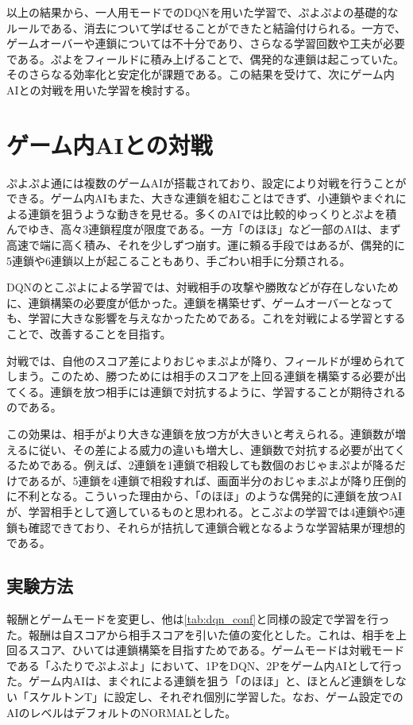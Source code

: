 \documentclass[12pt]{jarticle}
\begin{document}
以上の結果から、一人用モードでのDQNを用いた学習で、ぷよぷよの基礎的なルールである、消去について学ばせることができたと結論付けられる。一方で、ゲームオーバーや連鎖については不十分であり、さらなる学習回数や工夫が必要である。ぷよをフィールドに積み上げることで、偶発的な連鎖は起こっていた。そのさらなる効率化と安定化が課題である。この結果を受けて、次にゲーム内AIとの対戦を用いた学習を検討する。


\section{ゲーム内AIとの対戦}
ぷよぷよ通には複数のゲームAIが搭載されており、設定により対戦を行うことができる。ゲーム内AIもまた、大きな連鎖を組むことはできず、小連鎖やまぐれによる連鎖を狙うような動きを見せる。多くのAIでは比較的ゆっくりとぷよを積んでゆき、高々3連鎖程度が限度である。一方「のほほ」など一部のAIは、まず高速で端に高く積み、それを少しずつ崩す。運に頼る手段ではあるが、偶発的に5連鎖や6連鎖以上が起こることもあり、手ごわい相手に分類される。

DQNのとこぷよによる学習では、対戦相手の攻撃や勝敗などが存在しないために、連鎖構築の必要度が低かった。連鎖を構築せず、ゲームオーバーとなっても、学習に大きな影響を与えなかったためである。これを対戦による学習とすることで、改善することを目指す。

対戦では、自他のスコア差によりおじゃまぷよが降り、フィールドが埋められてしまう。このため、勝つためには相手のスコアを上回る連鎖を構築する必要が出てくる。連鎖を放つ相手には連鎖で対抗するように、学習することが期待されるのである。

この効果は、相手がより大きな連鎖を放つ方が大きいと考えられる。連鎖数が増えるに従い、その差による威力の違いも増大し、連鎖数で対抗する必要が出てくるためである。例えば、2連鎖を1連鎖で相殺しても数個のおじゃまぷよが降るだけであるが、5連鎖を4連鎖で相殺すれば、画面半分のおじゃまぷよが降り圧倒的に不利となる。こういった理由から、「のほほ」のような偶発的に連鎖を放つAIが、学習相手として適しているものと思われる。とこぷよの学習では4連鎖や5連鎖も確認できており、それらが拮抗して連鎖合戦となるような学習結果が理想的である。

\subsection{実験方法}
報酬とゲームモードを変更し、他は\ref{tab:dqn_conf}と同様の設定で学習を行った。報酬は自スコアから相手スコアを引いた値の変化とした。これは、相手を上回るスコア、ひいては連鎖構築を目指すためである。ゲームモードは対戦モードである「ふたりでぷよぷよ」において、1PをDQN、2Pをゲーム内AIとして行った。ゲーム内AIは、まぐれによる連鎖を狙う「のほほ」と、ほとんど連鎖をしない「スケルトンT」に設定し、それぞれ個別に学習した。なお、ゲーム設定でのAIのレベルはデフォルトのNORMALとした。
\end{document}
